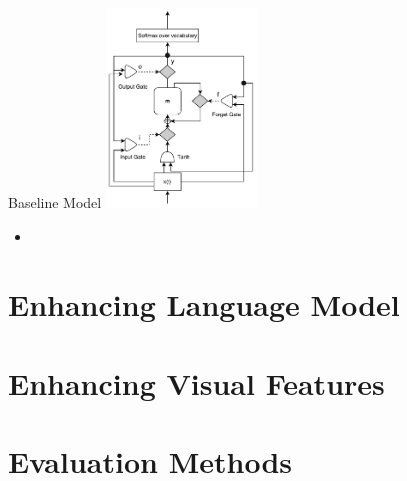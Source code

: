 \documentclass{beamer}
\begin{document}
\begin{frame}{Baseline Model}
\includegraphics[width=0.3\textwidth]{images/LstmBlockDiag.pdf}
\begin{itemize}
        \item 
\end{itemize} 
\end{frame}
\section{Enhancing Language Model}
\section{Enhancing Visual Features}
\section{Evaluation Methods}
\end{document}
